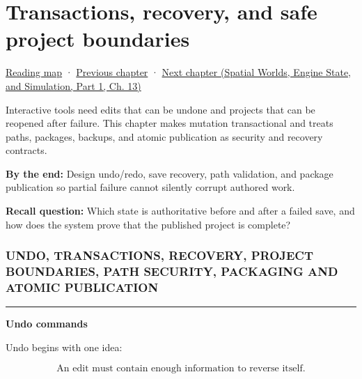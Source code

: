 \chapter{Transactions, recovery, and safe project boundaries}\label{05-engine-i-ch012-transactions-recovery-and-safe-project-boundaries}\hypertarget{05-engine-i-ch012}{}\label{stagechapter:05-engine-i-ch012}

\hypertarget{05-engine-i-ch012-transactions-recovery-and-safe-project-boundaries}{}

\hyperref[volume-reading-map]{Reading map} · \hyperref[05-engine-i-ch011-streaming-resources-through-explicit-states]{Previous chapter} · \href{../05-Spatial-Worlds-Engine-State-and-Simulation-P01/main.pdf\#nameddest=05-engine-i-ch013-portable-startup-windows-events-and-input}{Next chapter (Spatial Worlds, Engine State, and Simulation, Part 1, Ch. 13)}

Interactive tools need edits that can be undone and projects that can be reopened after failure. This chapter makes mutation transactional and treats paths, packages, backups, and atomic publication as security and recovery contracts.

\textbf{By the end:} Design undo/redo, save recovery, path validation, and package publication so partial failure cannot silently corrupt authored work.

\textbf{Recall question:} Which state is authoritative before and after a failed save, and how does the system prove that the published project is complete?

\subsection{UNDO, TRANSACTIONS, RECOVERY, PROJECT BOUNDARIES, PATH SECURITY, PACKAGING AND ATOMIC PUBLICATION}\label{05-engine-i-ch012-undo-transactions-recovery-project-boundaries-path-security-packaging-and-atomic-publication}

\hypertarget{05-engine-i-ch012-undo-transactions-recovery-project-boundaries-path-security-packaging-and-atomic-publication}{}

\begin{center}\rule{0.5\linewidth}{0.5pt}\end{center}

\textbf{Undo commands}

Undo begins with one idea:

\[
\boxed{
\text{An edit must contain enough information to reverse itself.}
}
\]

